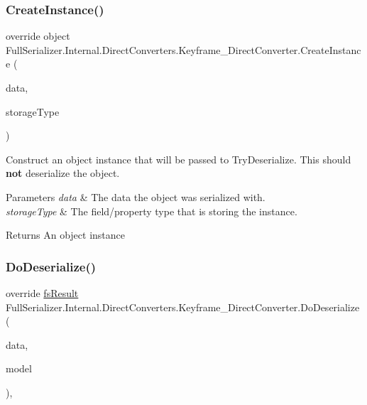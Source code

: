 \subsubsection{\texorpdfstring{Create\+Instance()}{CreateInstance()}}
{\footnotesize\ttfamily override object Full\+Serializer.\+Internal.\+Direct\+Converters.\+Keyframe\+\_\+\+Direct\+Converter.\+Create\+Instance (\begin{DoxyParamCaption}\item[{\hyperlink{class_full_serializer_1_1fs_data}{fs\+Data}}]{data,  }\item[{Type}]{storage\+Type }\end{DoxyParamCaption})\hspace{0.3cm}{\ttfamily [inline]}}



Construct an object instance that will be passed to Try\+Deserialize. This should {\bfseries not} deserialize the object. 


\begin{DoxyParams}{Parameters}
{\em data} & The data the object was serialized with.\\
\hline
{\em storage\+Type} & The field/property type that is storing the instance.\\
\hline
\end{DoxyParams}
\begin{DoxyReturn}{Returns}
An object instance
\end{DoxyReturn}
\mbox{\label{class_full_serializer_1_1_internal_1_1_direct_converters_1_1_keyframe___direct_converter_a42df774ee6b28aa10dd727040969154b}} 
\subsubsection{\texorpdfstring{Do\+Deserialize()}{DoDeserialize()}}
{\footnotesize\ttfamily override \hyperlink{struct_full_serializer_1_1fs_result}{fs\+Result} Full\+Serializer.\+Internal.\+Direct\+Converters.\+Keyframe\+\_\+\+Direct\+Converter.\+Do\+Deserialize (\begin{DoxyParamCaption}\item[{Dictionary$<$ string, \hyperlink{class_full_serializer_1_1fs_data}{fs\+Data} $>$}]{data,  }\item[{ref Keyframe}]{model }\end{DoxyParamCaption})\hspace{0.3cm}{\ttfamily [inline]}, {\ttfamily [protected]}}



